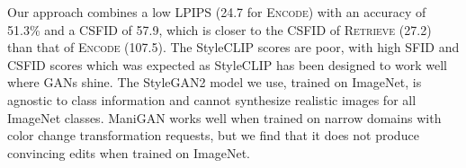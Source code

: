 \begin{table}
\centering
\small
{}
\caption{Evaluation  of \ours and baselines on ImageNet images. %
}
\label{tab1}
\end{table}




Our \ours approach  combines a  low \ac{LPIPS} (24.7  for \textsc{Encode}) with an 
accuracy of 51.3\% and a \ac{CSFID} of 57.9, which is closer to the \ac{CSFID} of
\textsc{Retrieve} (27.2) than that of \textsc{Encode} (107.5).
The StyleCLIP scores are poor, with high \ac{SFID} and \ac{CSFID} scores which was expected as 
StyleCLIP has been designed to work well where GANs shine.
The StyleGAN2 model we use, trained on ImageNet, is agnostic to class information and 
cannot synthesize realistic images for all ImageNet classes.
ManiGAN works well when trained on narrow domains with color change transformation 
requests, but we find that it does not produce convincing edits when trained on 
ImageNet.

